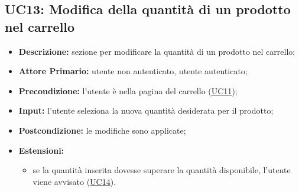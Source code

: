 
\subsection{UC13: Modifica della quantità di un prodotto nel carrello}
\label{sec:UC13}
\begin{itemize}
    \item \textbf{Descrizione:} sezione per modificare la quantità di un prodotto nel carrello;
    \item \textbf{Attore Primario:} utente non autenticato, utente autenticato;
    \item \textbf{Precondizione:} l'utente è nella pagina del carrello (\hyperref[sec:UC11]{\underline{UC11}});
    \item \textbf{Input:} l'utente seleziona la nuova quantità desiderata per il prodotto;
    \item \textbf{Postcondizione:} le modifiche sono applicate;
    \item \textbf{Estensioni:}
          \begin{itemize}
              \item se la quantità inserita dovesse superare la quantità disponibile, l'utente viene avvisato (\hyperref[sec:UC14]{\underline{UC14}}).
          \end{itemize}
\end{itemize}